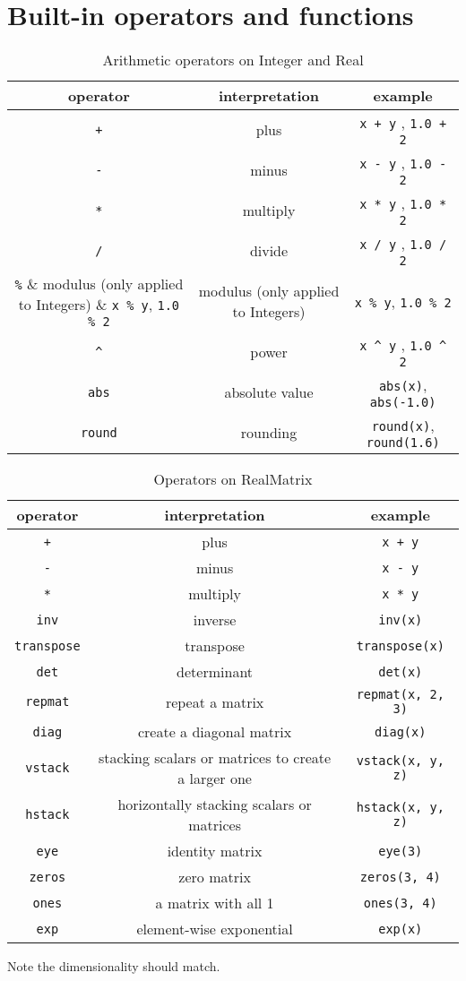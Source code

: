 \documentclass[12pt]{article}
\begin{document}
\section{Built-in operators and functions}\label{builtin-operator-appendix}
\begin{table}[H]
\centering
\caption{Arithmetic operators on Integer and Real}
\begin{tabular}{ c c c }
\toprule 
operator & interpretation & example \\
\midrule
\verb|+| & plus & \verb|x + y| , \verb|1.0 + 2|\\ 
\verb|-| & minus & \verb|x - y| , \verb|1.0 - 2|\\ 
\verb|*| & multiply & \verb|x * y| , \verb|1.0 * 2|\\
\verb|/| & divide & \verb|x / y| , \verb|1.0 / 2|\\ 
\verb|%| & modulus (only applied to Integers) & \verb|x % y|, \verb|1.0 % 2| \\
\verb|^| & power & \verb|x ^ y| , \verb|1.0 ^ 2| \\
\verb|abs| & absolute value & \verb|abs(x)|,  \verb|abs(-1.0)| \\
\verb|round| & rounding & \verb|round(x)|,  \verb|round(1.6)| \\
\bottomrule
\end{tabular}
\end{table}

\begin{table}[H]
\centering
\caption{Operators on RealMatrix
\label{tab:matrixop}
}
\begin{tabular}{ c c c }
\toprule 
operator & interpretation & example \\
\midrule
\verb|+| & plus & \verb|x + y| \\ 
\verb|-| & minus & \verb|x - y| \\ 
\verb|*| & multiply & \verb|x * y| \\
\verb|inv| & inverse & \verb|inv(x)| \\
\verb|transpose| & transpose & \verb|transpose(x)| \\
\verb|det| & determinant & \verb|det(x)| \\
\verb|repmat| & repeat a matrix & \verb|repmat(x, 2, 3)| \\
\verb|diag| & create a diagonal matrix & \verb|diag(x)| \\
\verb|vstack| & stacking scalars or matrices to create a larger one & \verb|vstack(x, y, z)| \\
\verb|hstack| & horizontally stacking scalars or matrices & \verb|hstack(x, y, z)| \\
\verb|eye| & identity matrix & \verb|eye(3)| \\
\verb|zeros| & zero matrix & \verb|zeros(3, 4)| \\
\verb|ones| & a matrix with all 1 & \verb|ones(3, 4)| \\
\verb|exp| & element-wise exponential  & \verb|exp(x)| \\
\bottomrule
\end{tabular}

Note the dimensionality should match. 
\end{table}
\end{document}
